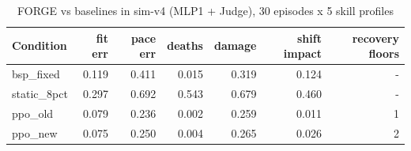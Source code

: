 \begin{table}[ht]
\centering
\small
\begin{tabular}{lrrrrrr}
\toprule
Condition & fit err & pace err & deaths & damage & shift impact & recovery floors \\
\midrule
bsp\_fixed & 0.119 & 0.411 & 0.015 & 0.319 & 0.124 & - \\
static\_8pct & 0.297 & 0.692 & 0.543 & 0.679 & 0.460 & - \\
ppo\_old & 0.079 & 0.236 & 0.002 & 0.259 & 0.011 & 1 \\
ppo\_new & 0.075 & 0.250 & 0.004 & 0.265 & 0.026 & 2 \\
\bottomrule
\end{tabular}
\caption{FORGE vs baselines in sim-v4 (MLP1 + Judge), 30 episodes x 5 skill profiles}
\label{tab:baselines_new_sim}
\end{table}
